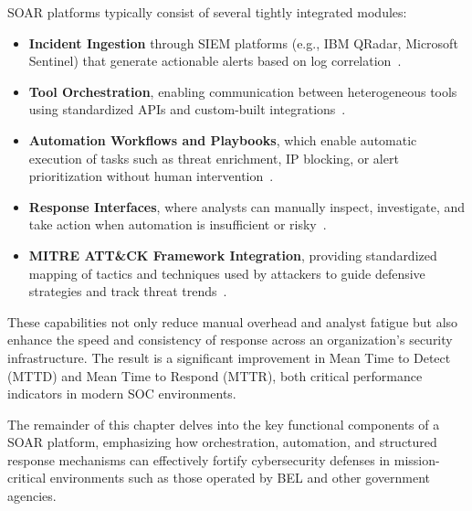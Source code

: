 SOAR platforms typically consist of several tightly integrated modules:
\begin{itemize}
    \item \textbf{Incident Ingestion} through SIEM platforms (e.g., IBM QRadar, Microsoft Sentinel) that generate actionable alerts based on log correlation~\cite{microsoftsiem}.
    \item \textbf{Tool Orchestration}, enabling communication between heterogeneous tools using standardized APIs and custom-built integrations~\cite{techtarget}.
    \item \textbf{Automation Workflows and Playbooks}, which enable automatic execution of tasks such as threat enrichment, IP blocking, or alert prioritization without human intervention~\cite{paloalto}.
    \item \textbf{Response Interfaces}, where analysts can manually inspect, investigate, and take action when automation is insufficient or risky~\cite{techtarget}.
    \item \textbf{MITRE ATT\&CK Framework Integration}, providing standardized mapping of tactics and techniques used by attackers to guide defensive strategies and track threat trends~\cite{mitre}.
\end{itemize}

These capabilities not only reduce manual overhead and analyst fatigue but also enhance the speed and consistency of response across an organization's security infrastructure. The result is a significant improvement in Mean Time to Detect (MTTD) and Mean Time to Respond (MTTR), both critical performance indicators in modern SOC environments.

The remainder of this chapter delves into the key functional components of a SOAR platform, emphasizing how orchestration, automation, and structured response mechanisms can effectively fortify cybersecurity defenses in mission-critical environments such as those operated by BEL and other government agencies.
